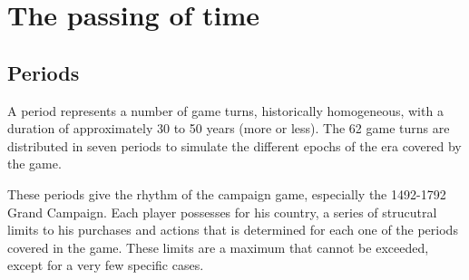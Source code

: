 



\section{The passing of time}




\subsection{Periods}

A period represents a number of game turns, historically homogeneous, with a
duration of approximately 30 to 50 years (more or less). The 62 game turns are
distributed in seven periods to simulate the different epochs of the era
covered by the game.

These periods give the rhythm of the campaign game, especially the 1492-1792
Grand Campaign. Each player possesses for his country, a series of strucutral
limits to his purchases and actions that is determined for each one of the
periods covered in the game. These limits are a maximum that cannot be
exceeded, except for a very few specific cases.



